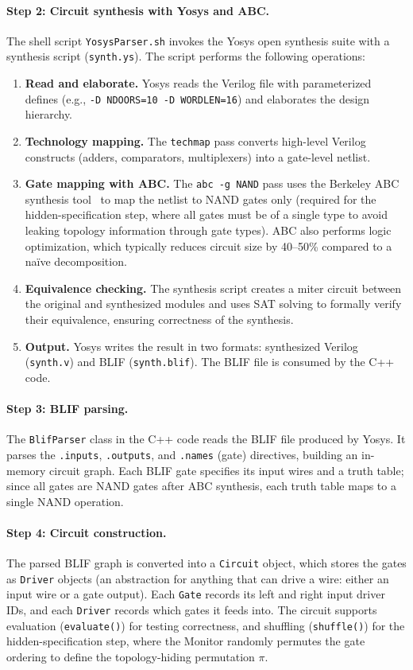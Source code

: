 \paragraph{Step 2: Circuit synthesis with Yosys and ABC.}
The shell script \texttt{YosysParser.sh} invokes the Yosys open synthesis suite with a synthesis script (\texttt{synth.ys}). The script performs the following operations:
\begin{enumerate}
    \item \textbf{Read and elaborate.} Yosys reads the Verilog file with parameterized defines (e.g., \texttt{-D NDOORS=10 -D WORDLEN=16}) and elaborates the design hierarchy.
    \item \textbf{Technology mapping.} The \texttt{techmap} pass converts high-level Verilog constructs (adders, comparators, multiplexers) into a gate-level netlist.
    \item \textbf{Gate mapping with ABC.} The \texttt{abc -g NAND} pass uses the Berkeley ABC synthesis tool~\cite{BM10} to map the netlist to NAND gates only (required for the hidden-specification step, where all gates must be of a single type to avoid leaking topology information through gate types). ABC also performs logic optimization, which typically reduces circuit size by 40--50\% compared to a naïve decomposition.
    \item \textbf{Equivalence checking.} The synthesis script creates a miter circuit between the original and synthesized modules and uses SAT solving to formally verify their equivalence, ensuring correctness of the synthesis.
    \item \textbf{Output.} Yosys writes the result in two formats: synthesized Verilog (\texttt{synth.v}) and BLIF (\texttt{synth.blif}). The BLIF file is consumed by the C++ code.
\end{enumerate}

\paragraph{Step 3: BLIF parsing.}
The \texttt{BlifParser} class in the C++ code reads the BLIF file produced by Yosys. It parses the \texttt{.inputs}, \texttt{.outputs}, and \texttt{.names} (gate) directives, building an in-memory circuit graph. Each BLIF gate specifies its input wires and a truth table; since all gates are NAND gates after ABC synthesis, each truth table maps to a single NAND operation.

\paragraph{Step 4: Circuit construction.}
The parsed BLIF graph is converted into a \texttt{Circuit} object, which stores the gates as \texttt{Driver} objects (an abstraction for anything that can drive a wire: either an input wire or a gate output). Each \texttt{Gate} records its left and right input driver IDs, and each \texttt{Driver} records which gates it feeds into. The circuit supports evaluation (\texttt{evaluate()}) for testing correctness, and shuffling (\texttt{shuffle()}) for the hidden-specification step, where the Monitor randomly permutes the gate ordering to define the topology-hiding permutation $\pi$.

